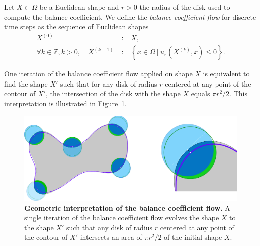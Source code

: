 \documentclass[smallextended]{svjour3}
\newcommand{\Z}{\mathbb{Z}}
\begin{document}
\begin{definition}
  Let $X \subset \Omega$ be a Euclidean shape and $r>0$ the radius of the disk used to compute the balance coefficient. We define the \emph{balance coefficient flow} for discrete time steps as the sequence of Euclidean shapes
%
%
\begin{align}
  X^{(0)} & := X, \nonumber \\
  \forall k \in \Z, k > 0, \quad X^{(k+1)} & := \left\{ x \in \Omega \: | \: u_r(X^{(k)}, x) \leq 0 \right\}. \label{eq-balance-coefficient-flow}
\end{align}
%
%
\end{definition}
%
%
 One iteration of the balance coefficient flow applied on shape $X$ is equivalent to find the shape $X'$ such that for any disk of radius $r$ centered at any point of the contour of $X'$, the intersection of the disk with the shape $X$ equals $\pi r^2/2$. This interpretation is illustrated in Figure~\ref{fig:geometric-interpretation}.
%
% 
\begin{figure}
\center
\includegraphics[scale=0.25]{figures/zero-level-set/geometric-interpretation.png}
\caption{\textbf{Geometric interpretation of the balance coefficient flow.} A single iteration of the balance coefficient flow evolves the shape $X$ to the shape $X'$ such that any disk of radius $r$ centered at any point of the contour of $X'$ intersects  an area of $\pi r^2/2$ of the initial shape $X$.}
\label{fig:geometric-interpretation}
\end{figure}
% 
%
\end{document}
